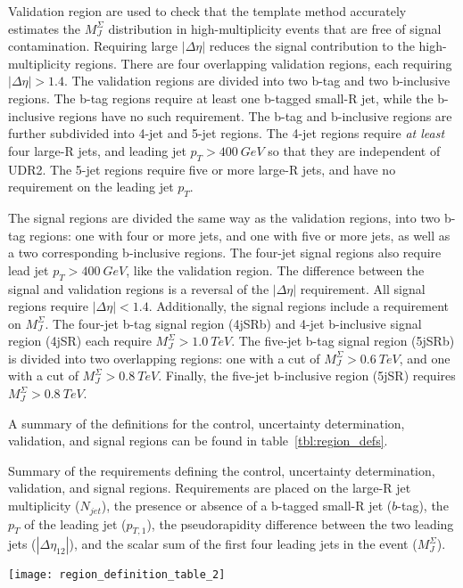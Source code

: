 Validation region are used to check that the template method accurately estimates the $M_J^{\Sigma}$ distribution in
high-multiplicity events that are free of signal contamination.
Requiring large $|\Delta\eta|$ reduces the signal contribution to the high-multiplicity regions.
There are four overlapping validation regions, each requiring $|\Delta\eta| > 1.4$.
The validation regions are divided into two b-tag and two b-inclusive regions.
The b-tag regions require at least one b-tagged small-R jet, while the b-inclusive regions have no such requirement.
The b-tag and b-inclusive regions are further subdivided into 4-jet and 5-jet regions.
The 4-jet regions require \textit{at least} four large-R jets, and leading jet $p_T>400~GeV$ so that they are independent of UDR2.
The 5-jet regions require five or more large-R jets, and have no requirement on the leading jet $p_T$.

The signal regions are divided the same way as the validation regions, into two b-tag regions: one with four or more jets,
and one with five or more jets, as well as a two corresponding b-inclusive regions.
The four-jet signal regions also require lead jet $p_T>400~GeV$, like the validation region.
The difference between the signal and validation regions is a reversal of the $|\Delta\eta|$ requirement.
All signal regions require $|\Delta\eta|<1.4$.
Additionally, the signal regions include a requirement on $M_J^{\Sigma}$.
The four-jet b-tag signal region (4jSRb) and 4-jet b-inclusive signal region (4jSR) each require $M_J^{\Sigma} > 1.0~TeV$.
The five-jet b-tag signal region (5jSRb) is divided into two overlapping regions: one with a cut of $M_J^{\Sigma}>0.6~TeV$,
and one with a cut of $M_J^{\Sigma}>0.8~TeV$.
Finally, the five-jet b-inclusive region (5jSR) requires $M_J^{\Sigma}>0.8~TeV$.

A summary of the definitions for the control, uncertainty determination, validation, and signal regions can be found in table~\ref{tbl:region_defs}.

\begin{table}
    \caption{Summary of the requirements defining the control, uncertainty determination, validation, and signal regions.
    Requirements are placed on the large-R jet multiplicity ($N_{jet}$), the presence or absence of a b-tagged small-R jet ($b$-tag),
    the $p_T$ of the leading jet ($p_{T,1}$), the pseudorapidity difference between the two leading jets ($|\Delta\eta_{12}|$),
    and the scalar sum of the first four leading jets in the event ($M_J^{\Sigma}$).}
    \label{tbl:region_defs}
    \texttt{[image: region\_definition\_table\_2]}
\end{table}


